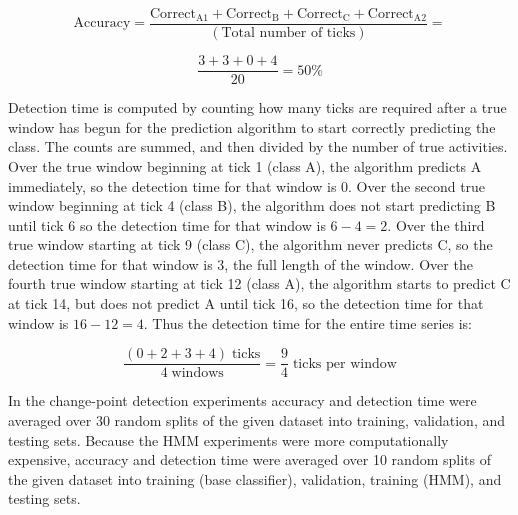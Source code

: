 \[
\text{Accuracy} = \frac{\text{Correct}_{\text{A1}} + \text{Correct}_{\text{B}} + \text{Correct}_{\text{C}} + \text{Correct}_{\text{A2}}}{(\text{Total number of ticks})} =
\]

\[
\frac{3 + 3 + 0 + 4}{20} = 50\%
\]

Detection time is computed by counting how many ticks are required after a true
window has begun for the prediction algorithm to start correctly
predicting the class. The counts are summed, and then divided by the number of
true activities. Over the true window beginning at tick 1 (class A), the algorithm predicts A
immediately, so the detection time for that window is 0. Over the second true
window beginning at tick 4 (class B), the algorithm does not start predicting
B until tick 6 so the detection time for that window is $6-4=2$. Over the third
true window starting at tick 9 (class C),
the algorithm never predicts C, so the detection time for that window is 3, the
full length of the window. Over the fourth true window starting at tick 12 (class A), the
algorithm starts to predict C at tick 14, but does not predict A until tick 16,
so the detection time for that window is $16 - 12 = 4$. Thus the detection time
for the entire time series is:

\[
\frac{(0 + 2 + 3 + 4) \; \text{ticks}}{4 \; \text{windows}} = \frac{9}{4} \; \text{ticks per window}
\]

In the change-point detection experiments accuracy and detection time were
averaged over 30 random splits of the given dataset into training, validation, and
testing sets. Because the HMM experiments were more computationally
expensive, accuracy and detection time were averaged over 10 random splits of
the given dataset into training (base classifier), validation, training (HMM),
and testing sets.
